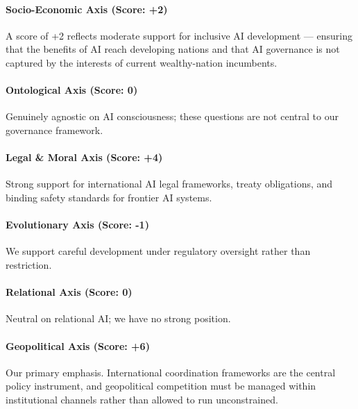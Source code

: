 \paragraph{Socio-Economic Axis (Score:
+2)}\label{socio-economic-axis-score-2}

A score of +2 reflects moderate support for inclusive AI development ---
ensuring that the benefits of AI reach developing nations and that AI
governance is not captured by the interests of current wealthy-nation
incumbents.

\paragraph{Ontological Axis (Score: 0)}\label{ontological-axis-score-0}

Genuinely agnostic on AI consciousness; these questions are not central
to our governance framework.

\paragraph{Legal \& Moral Axis (Score:
+4)}\label{legal-moral-axis-score-4}

Strong support for international AI legal frameworks, treaty
obligations, and binding safety standards for frontier AI systems.

\paragraph{Evolutionary Axis (Score:
-1)}\label{evolutionary-axis-score--1}

We support careful development under regulatory oversight rather than
restriction.

\paragraph{Relational Axis (Score: 0)}\label{relational-axis-score-0}

Neutral on relational AI; we have no strong position.

\paragraph{Geopolitical Axis (Score:
+6)}\label{geopolitical-axis-score-6}

Our primary emphasis. International coordination frameworks are the
central policy instrument, and geopolitical competition must be managed
within institutional channels rather than allowed to run unconstrained.

